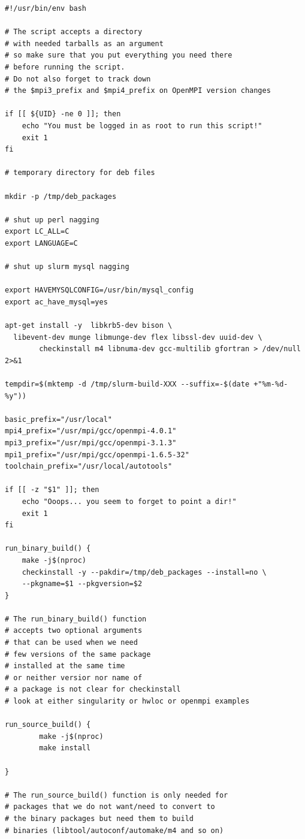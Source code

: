 \documentclass[a4paper]{extarticle}
\begin{document}
\begin{verbatim}
#!/usr/bin/env bash

# The script accepts a directory
# with needed tarballs as an argument
# so make sure that you put everything you need there
# before running the script.
# Do not also forget to track down
# the $mpi3_prefix and $mpi4_prefix on OpenMPI version changes

if [[ ${UID} -ne 0 ]]; then
    echo "You must be logged in as root to run this script!"
    exit 1
fi

# temporary directory for deb files

mkdir -p /tmp/deb_packages

# shut up perl nagging
export LC_ALL=C
export LANGUAGE=C

# shut up slurm mysql nagging

export HAVEMYSQLCONFIG=/usr/bin/mysql_config
export ac_have_mysql=yes

apt-get install -y  libkrb5-dev bison \
  libevent-dev munge libmunge-dev flex libssl-dev uuid-dev \
        checkinstall m4 libnuma-dev gcc-multilib gfortran > /dev/null 2>&1

tempdir=$(mktemp -d /tmp/slurm-build-XXX --suffix=-$(date +"%m-%d-%y"))

basic_prefix="/usr/local"
mpi4_prefix="/usr/mpi/gcc/openmpi-4.0.1"
mpi3_prefix="/usr/mpi/gcc/openmpi-3.1.3"
mpi1_prefix="/usr/mpi/gcc/openmpi-1.6.5-32"
toolchain_prefix="/usr/local/autotools"

if [[ -z "$1" ]]; then
    echo "Ooops... you seem to forget to point a dir!"
    exit 1
fi

run_binary_build() {
    make -j$(nproc)
    checkinstall -y --pakdir=/tmp/deb_packages --install=no \
    --pkgname=$1 --pkgversion=$2
}

# The run_binary_build() function
# accepts two optional arguments
# that can be used when we need
# few versions of the same package
# installed at the same time
# or neither versior nor name of
# a package is not clear for checkinstall
# look at either singularity or hwloc or openmpi examples

run_source_build() {
        make -j$(nproc)
        make install

}

# The run_source_build() function is only needed for
# packages that we do not want/need to convert to
# the binary packages but need them to build
# binaries (libtool/autoconf/automake/m4 and so on)


\end{verbatim}
\end{document}
